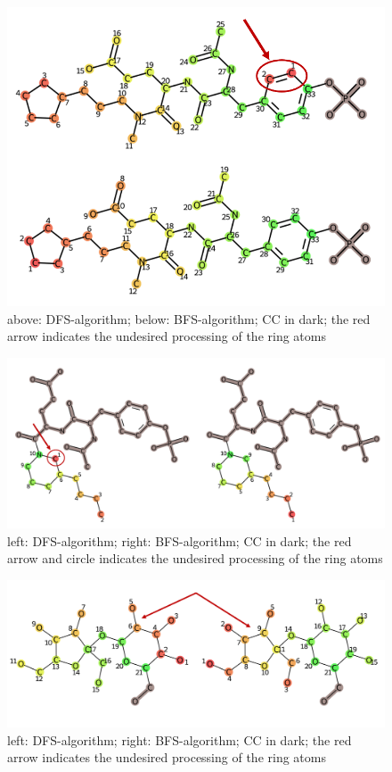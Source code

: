 \begin{figure}
\includegraphics[scale=0.75]{simple_ring_exampledfs2_two_rows}\caption{above: DFS-algorithm; below: BFS-algorithm; CC in dark; the
red arrow indicates the undesired processing of the ring atoms}
\label{fig:simple_ring_exampledfs2}
\end{figure}

\begin{figure}
\includegraphics[scale=1.3]{simple_ring_exampledfs3}\caption{left: DFS-algorithm; right: BFS-algorithm; CC in dark; the
red arrow and circle indicates the undesired processing of the ring
atoms}
\label{fig:simple_ring_exampledfs3}
\end{figure}
\begin{figure}

\includegraphics[scale=0.5]{simple_ring_exampledfs4}\caption{left: DFS-algorithm; right: BFS-algorithm; CC in dark; the
red arrow indicates the undesired processing of the ring atoms}
\label{fig:simple_ring_exampledfs4}
\end{figure}

